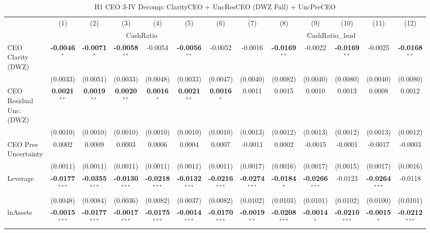 \documentclass[11pt,a4paper]{article}
\begin{document}
\clearpage
\begin{table}[htbp]
\centering
\caption{H1 CEO 3-IV Decomp: ClarityCEO + UncResCEO (DWZ Full) + UncPreCEO}
\label{tab:h1_ceo2_decomp}
\scriptsize
\begin{tabular}{lcccccccccccc}
\toprule
 & (1) & (2) & (3) & (4) & (5) & (6) & (7) & (8) & (9) & (10) & (11) & (12) \\
 & \multicolumn{6}{c}{CashRatio} & \multicolumn{6}{c}{CashRatio\_lead} \\
\cmidrule(lr){2-7} \cmidrule(lr){8-13}
\midrule
CEO Clarity (DWZ) & \textbf{-0.0046}$^{*}$ & \textbf{-0.0071}$^{*}$ & \textbf{-0.0058}$^{**}$ & -0.0054 & \textbf{-0.0056}$^{**}$ & -0.0052 & -0.0016 & \textbf{-0.0169}$^{**}$ & -0.0022 & \textbf{-0.0169}$^{**}$ & -0.0025 & \textbf{-0.0168}$^{**}$ \\
 & (0.0033) & (0.0051) & (0.0033) & (0.0048) & (0.0033) & (0.0047) & (0.0040) & (0.0082) & (0.0040) & (0.0080) & (0.0040) & (0.0080) \\
CEO Residual Unc. (DWZ) & \textbf{0.0021}$^{**}$ & \textbf{0.0019}$^{**}$ & \textbf{0.0020}$^{**}$ & \textbf{0.0016}$^{*}$ & \textbf{0.0021}$^{**}$ & \textbf{0.0016}$^{*}$ & 0.0011 & 0.0015 & 0.0010 & 0.0013 & 0.0008 & 0.0012 \\
 & (0.0010) & (0.0010) & (0.0010) & (0.0010) & (0.0010) & (0.0010) & (0.0013) & (0.0012) & (0.0013) & (0.0012) & (0.0013) & (0.0012) \\
CEO Pres Uncertainty & 0.0002 & 0.0009 & 0.0003 & 0.0006 & 0.0004 & 0.0007 & -0.0011 & 0.0002 & -0.0015 & -0.0001 & -0.0017 & -0.0003 \\
 & (0.0011) & (0.0011) & (0.0011) & (0.0011) & (0.0011) & (0.0011) & (0.0017) & (0.0016) & (0.0017) & (0.0015) & (0.0017) & (0.0016) \\
\midrule
Leverage & \textbf{-0.0177}$^{***}$ & \textbf{-0.0355}$^{***}$ & \textbf{-0.0130}$^{***}$ & \textbf{-0.0218}$^{***}$ & \textbf{-0.0132}$^{***}$ & \textbf{-0.0216}$^{***}$ & \textbf{-0.0274}$^{***}$ & \textbf{-0.0184}$^{*}$ & \textbf{-0.0266}$^{***}$ & -0.0123 & \textbf{-0.0264}$^{***}$ & -0.0118 \\
 & (0.0048) & (0.0084) & (0.0036) & (0.0082) & (0.0037) & (0.0082) & (0.0102) & (0.0103) & (0.0101) & (0.0102) & (0.0100) & (0.0101) \\
lnAssets & \textbf{-0.0015}$^{***}$ & \textbf{-0.0177}$^{***}$ & \textbf{-0.0017}$^{***}$ & \textbf{-0.0175}$^{***}$ & \textbf{-0.0014}$^{***}$ & \textbf{-0.0170}$^{***}$ & \textbf{-0.0019}$^{**}$ & \textbf{-0.0208}$^{***}$ & \textbf{-0.0014}$^{*}$ & \textbf{-0.0210}$^{***}$ & \textbf{-0.0015}$^{*}$ & \textbf{-0.0212}$^{***}$ \\

\end{tabular}
\end{table}
\end{document}
